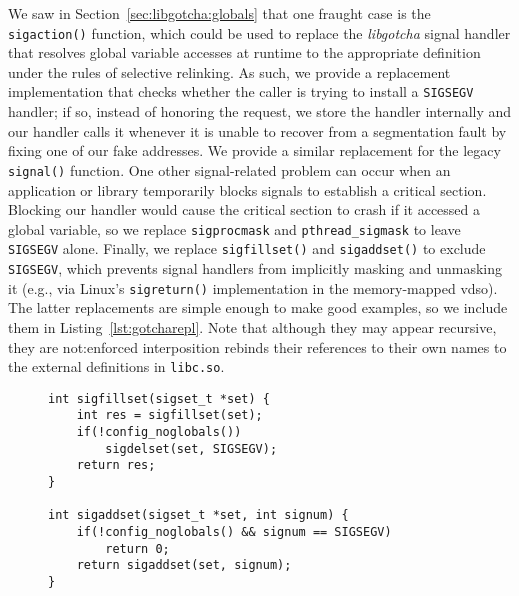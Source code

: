 We saw in Section~\ref{sec:libgotcha:globals} that one fraught case is the
\texttt{sigaction()} function, which could be used to replace the \textit{libgotcha}
signal handler that resolves global variable accesses at runtime to the appropriate
definition under the rules of selective relinking.  As such, we provide a replacement
implementation that checks whether the caller is trying to install a \texttt{SIGSEGV}
handler; if so, instead of honoring the request, we store the handler internally and
our handler calls it whenever it is unable to recover from a segmentation fault by
fixing one of our fake addresses.  We provide a similar replacement for the legacy
\texttt{signal()} function.  One other signal-related problem can occur when an
application or library temporarily blocks signals to establish a critical section.
Blocking our handler would cause the critical section to crash if it accessed a
global variable, so we replace \texttt{sigprocmask} and \texttt{pthread\_sigmask} to
leave \texttt{SIGSEGV} alone.  Finally, we replace \texttt{sigfillset()} and
\texttt{sigaddset()} to exclude \texttt{SIGSEGV}, which prevents signal handlers from
implicitly masking and unmasking it (e.g., via Linux's \texttt{sigreturn()}
implementation in the memory-mapped vdso).  The latter replacements are simple enough
to make good examples, so we include them in Listing~\ref{lst:gotcharepl}.  Note that
although they may appear recursive, they are not:\@ enforced interposition rebinds
their references to their own names to the external definitions in \texttt{libc.so}.

\begin{figure}
\begin{lstlisting}[label=lst:gotcharepl,caption=\textit{libgotcha} \texttt{sigfillset()} and \texttt{sigaddset()} replacements]
int sigfillset(sigset_t *set) {
	int res = sigfillset(set);
	if(!config_noglobals())
		sigdelset(set, SIGSEGV);
	return res;
}

int sigaddset(sigset_t *set, int signum) {
	if(!config_noglobals() && signum == SIGSEGV)
		return 0;
	return sigaddset(set, signum);
}
\end{lstlisting}
\end{figure}

